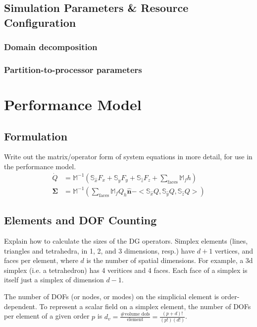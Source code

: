 \documentclass[11pt]{article}
\begin{document}
\subsection{Simulation Parameters \& Resource Configuration}

\subsubsection{Domain decomposition}

\subsubsection{Partition-to-processor parameters}

\section{Performance Model}
\subsection{Formulation}
Write out the matrix/operator form of system equations in more detail, for use in the performance model.
\begin{align}
  \dot{Q} &= \mathbb{M}^{-1}\left(\mathbb{S}_{\hat{x}} F_x + \mathbb{S}_{\hat{y}} F_y + \mathbb{S}_{\hat{z}} F_z + \sum_\text{faces} \mathbb{M}_f h\right) \\
  \mathbf{\Sigma} &= \mathbb{M}^{-1}\left(\sum_{\text{faces}}{\mathbb{M}_f Q_h\hat{\mathbf{n}}} - <\mathbb{S}_{\hat{x}} Q, \mathbb{S}_{\hat{y}}Q, \mathbb{S}_{\hat{z}}Q>\right)
\end{align}

\subsection{Elements and DOF Counting}

Explain how to calculate the sizes of the DG operators.  Simplex elements (lines, triangles and tetrahedra, in 1, 2, and 3 dimensions, resp.) have $d+1$ vertices, and faces per element, where $d$ is the number of spatial dimensions.  For example, a 3d simplex (i.e. a tetrahedron) has 4 veritices and 4 faces.  Each face of a simplex is itself just a simplex of dimension $d-1$.

The number of DOFs (or nodes, or modes) on the simplicial element is order-dependent. To represent a scalar field on a simplex element, the number of DOFs per element of a given order $p$ is $d_v=\frac{\text{\# volume dofs}}{\text{element}}=\frac{(p+d)!}{(p!)(d!)}$.
\end{document}
